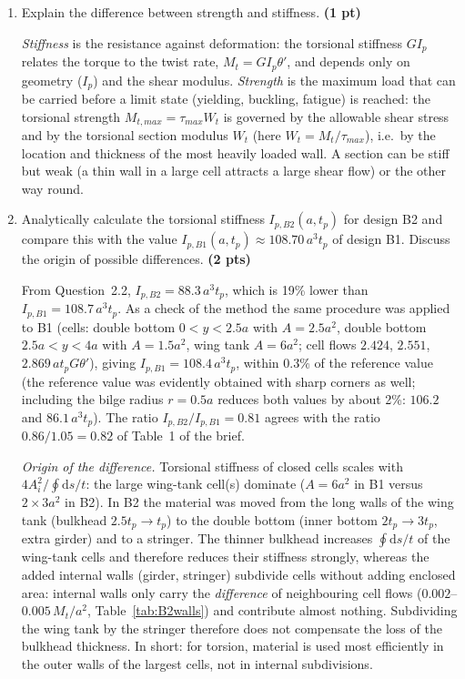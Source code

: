 \begin{enumerate}[label=\alph*.]
  \item Explain the difference between strength and stiffness. \textbf{(1 pt)}

  \emph{Stiffness} is the resistance against deformation: the torsional stiffness $GI_p$ relates the torque to the twist rate, $M_t=GI_p\theta'$, and depends only on geometry ($I_p$) and the shear modulus. \emph{Strength} is the maximum load that can be carried before a limit state (yielding, buckling, fatigue) is reached: the torsional strength $M_{t,max}=\tau_{max}W_t$ is governed by the allowable shear stress and by the torsional section modulus $W_t$ (here $W_t=M_t/\tau_{max}$), i.e.\ by the location and thickness of the most heavily loaded wall. A section can be stiff but weak (a thin wall in a large cell attracts a large shear flow) or the other way round.

  \item Analytically calculate the torsional stiffness $I_{p,B2}(a,t_p)$ for design B2 and compare this with the value $I_{p,B1}(a,t_p)\approx108.70\,a^3t_p$ of design B1. Discuss the origin of possible differences. \textbf{(2 pts)}

  From Question~2.2, $\boxed{I_{p,B2}=88.3\,a^3t_p}$, which is 19\% lower than $I_{p,B1}=108.7\,a^3t_p$. As a check of the method the same procedure was applied to B1 (cells: double bottom $0<y<2.5a$ with $A=2.5a^2$, double bottom $2.5a<y<4a$ with $A=1.5a^2$, wing tank $A=6a^2$; cell flows $2.424$, $2.551$, $2.869\,at_pG\theta'$), giving $I_{p,B1}=108.4\,a^3t_p$, within $0.3\%$ of the reference value (the reference value was evidently obtained with sharp corners as well; including the bilge radius $r=0.5a$ reduces both values by about 2\%: $106.2$ and $86.1\,a^3t_p$). The ratio $I_{p,B2}/I_{p,B1}=0.81$ agrees with the ratio $0.86/1.05=0.82$ of Table~1 of the brief.

  \emph{Origin of the difference.} Torsional stiffness of closed cells scales with $4A_i^2/\oint\mathrm{d}s/t$: the large wing-tank cell(s) dominate ($A=6a^2$ in B1 versus $2\times3a^2$ in B2). In B2 the material was moved from the long walls of the wing tank (bulkhead $2.5t_p\to t_p$) to the double bottom (inner bottom $2t_p\to3t_p$, extra girder) and to a stringer. The thinner bulkhead increases $\oint\mathrm{d}s/t$ of the wing-tank cells and therefore reduces their stiffness strongly, whereas the added internal walls (girder, stringer) subdivide cells without adding enclosed area: internal walls only carry the \emph{difference} of neighbouring cell flows ($0.002$--$0.005\,M_t/a^2$, Table~\ref{tab:B2walls}) and contribute almost nothing. Subdividing the wing tank by the stringer therefore does not compensate the loss of the bulkhead thickness. In short: for torsion, material is used most efficiently in the outer walls of the largest cells, not in internal subdivisions.


\end{enumerate}
